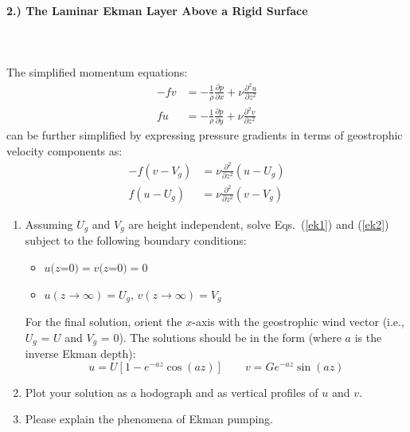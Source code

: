 \documentclass[11pt]{article}
\begin{document}
\paragraph{2.) The Laminar Ekman Layer Above a Rigid Surface}~\\\\
The simplified momentum equations:
\begin{align*}
-fv &= -\frac{1}{\rho}\frac{\partial p}{\partial x} + \nu\frac{\partial^2 u}{\partial z^2}\\
fu &=  -\frac{1}{\rho}\frac{\partial p}{\partial y} + \nu\frac{\partial^2 v}{\partial z^2}
\end{align*}
can be further simplified by expressing pressure gradients in terms of geostrophic velocity components as:
\begin{align}
\label{ek1}
-f(v-V_g) &= \nu\frac{\partial^2}{\partial z^2}(u-U_g)\\
\label{ek2}
f(u-U_g)  &= \nu\frac{\partial^2}{\partial z^2}(v-V_g)
\end{align}
\begin{enumerate}[label=(\alph*),topsep=-10pt]
	\item Assuming $U_g$ and $V_g$ are height independent, solve Eqs.~(\ref{ek1}) and (\ref{ek2}) subject to the following boundary conditions:
	\begin{itemize}
		\item $u(z$=$0) = v(z$=$0) = 0$
		\item $u(z\rightarrow \infty)=U_g$, $v(z\rightarrow \infty)=V_g$
	\end{itemize}
	For the final solution, orient the $x$-axis with the geostrophic wind vector (i.e., $U_g$ = $U$ and $V_g$ = $0$). The solutions should be in the form (where $a$ is the inverse Ekman depth):
	$$u = U[ 1 - e^{-az} \cos(az)]\qquad v = Ge^{-az}\sin(az)$$
	\item Plot your solution as a hodograph and as vertical profiles of $u$ and $v$.
	\item Please explain the phenomena of Ekman pumping.
\end{enumerate}
\end{document}
